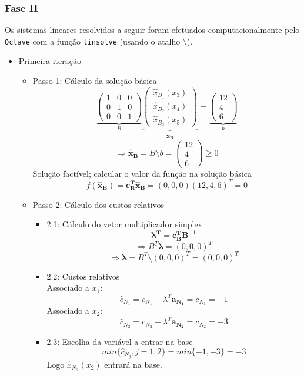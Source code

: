 \documentclass[a4paper, 12pt]{article}
\begin{document}
\subsubsection{Fase II}
Os sistemas lineares resolvidos a seguir foram efetuados computacionalmente pelo \verb+Octave+ com a função \verb+linsolve+ (usando o atalho $\setminus$).
\begin{itemize}
	\item Primeira iteração
	\begin{itemize}
		\item Passo 1: Cálculo da solução básica
\[
\underbrace{
\begin{pmatrix}
1&0&0\\
0&1&0\\
0&0&1
\end{pmatrix}}_B
\underbrace{
\begin{pmatrix}
\hat{x}_{B_1} (x_3)\\
\hat{x}_{B_2} (x_4)\\
\hat{x}_{B_3} (x_5)
\end{pmatrix}}_{\mathbf{\hat{x}_B}}
=
\underbrace{
\begin{pmatrix}
12\\
4\\
6
\end{pmatrix}}_{b}
\]
\[
\Rightarrow \mathbf{\hat{x}_B} = B \setminus b =
\begin{pmatrix}
12\\
4\\
6
\end{pmatrix}
\geq 0
\]
Solução factível; calcular o valor da função na solução básica
\[
f(\mathbf{\hat{x}_B})=\mathbf{c_B^T\hat{x}_B}=(0,0,0)(12,4,6)^T=0
\]
		\item Passo 2: Cálculo dos custos relativos
		\begin{itemize}
\item 2.1: Cálculo do vetor multiplicador simplex
\[
\mathbf{\lambda^T}=\mathbf{c_B^TB^{-1}}
\]
\[
\Rightarrow B^T \mathbf{\lambda}=(0, 0, 0)^T
\]
\[
 \Rightarrow \mathbf{\lambda}=B^T \setminus (0,0,0)^T=(0,0,0)^T
\]
\item 2.2: Custos relativos\\
Associado a $x_1$:
\[
\hat{c}_{N_1}=c_{N_1}-\lambda^T\mathbf{a_{N_1}}=c_{N_1}=-1
\]
Associado a $x_2$:
\[
\hat{c}_{N_2}=c_{N_2}-\lambda^T\mathbf{a_{N_2}}=c_{N_2}=-3
\]
\item 2.3: Escolha da variável a entrar na base
\[
min\{ \hat{c}_{N_j}, j=1,2\}=min\{ -1, -3\}=-3
\]
Logo $\hat{x}_{N_2} (x_2)$ entrará na base. 

\end{itemize}
\end{itemize}
\end{itemize}
\end{document}
